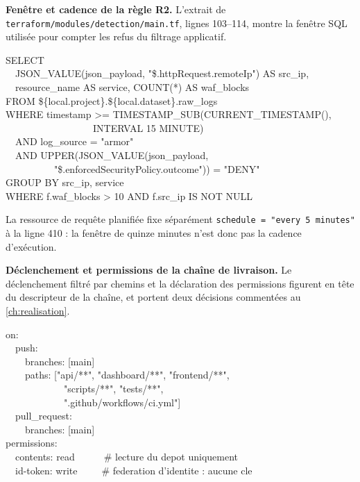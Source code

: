 \textbf{Fenêtre et cadence de la règle R2.} L'extrait de
\texttt{terraform/\allowbreak modules/\allowbreak detection/\allowbreak main.tf}, lignes
103--114, montre la fenêtre SQL utilisée pour
compter les refus du filtrage applicatif.

\begin{extraitconf}[boxsep=1pt, left=3pt, right=3pt, top=2pt, bottom=2pt]
SELECT\\
\ \ JSON\_VALUE(json\_payload, "\$.httpRequest.remoteIp") AS src\_ip,\\
\ \ resource\_name AS service, COUNT(*) AS waf\_blocks\\
FROM \textasciigrave\$\{local.project\}.\$\{local.dataset\}.raw\_logs\textasciigrave\\
WHERE timestamp >= TIMESTAMP\_SUB(CURRENT\_TIMESTAMP(),\\
\ \ \ \ \ \ \ \ \ \ \ \ \ \ \ \ \ \ INTERVAL 15 MINUTE)\\
\ \ AND log\_source = "armor"\\
\ \ AND UPPER(JSON\_VALUE(json\_payload,\\
\ \ \ \ \ \ \ \ \ \ "\$.enforcedSecurityPolicy.outcome")) = "DENY"\\
GROUP BY src\_ip, service\\
WHERE f.waf\_blocks > 10 AND f.src\_ip IS NOT NULL
\end{extraitconf}

La ressource de requête planifiée fixe séparément \texttt{schedule = "every 5 minutes"} à la
ligne 410 : la fenêtre de quinze minutes n'est donc pas la cadence d'exécution.

\textbf{Déclenchement et permissions de la chaîne de livraison.} Le déclenchement filtré par
chemins et la déclaration des permissions figurent en tête du descripteur de la chaîne, et portent
deux décisions commentées au \cref{ch:realisation}.

\begin{extraitconf}[boxsep=1pt, left=3pt, right=3pt, top=2pt, bottom=2pt]
on:\\
\ \ push:\\
\ \ \ \ branches: [main]\\
\ \ \ \ paths: ["api/**", "dashboard/**", "frontend/**",\\
\ \ \ \ \ \ \ \ \ \ \ \ "scripts/**", "tests/**",\\
\ \ \ \ \ \ \ \ \ \ \ \ ".github/workflows/ci.yml"]\\
\ \ pull\_request:\\
\ \ \ \ branches: [main]\\[0.4em]
permissions:\\
\ \ contents: read\ \ \ \ \ \ \# lecture du depot uniquement\\
\ \ id-token: write\ \ \ \ \ \# federation d'identite : aucune cle
\end{extraitconf}

